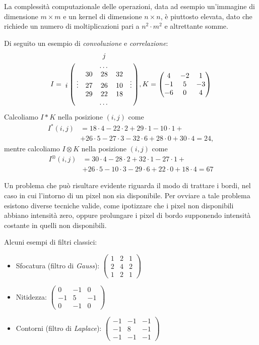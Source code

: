 La complessit\`a computazionale delle operazioni, data ad esempio un'immagine di dimensione $m\times m$ e un kernel di dimensione $n\times n$, \`e piuttosto elevata, dato che richiede un numero di moltiplicazioni pari a $n^{2}\cdot m^{2}$ e altrettante somme.\par
Di seguito un esempio di \textit{convoluzione} e \textit{correlazione}:
$$
I=\bordermatrix{
		& & & j & & \cr
        & & & \dots & & \cr
		& & 30 & 28 & 32 & \cr
		i & \vdots & 27 & 26 & 10 & \vdots \cr
		& & 29 & 22 & 18 & \cr
		& & & \dots & & \cr
	},
K=\begin{pmatrix} 
	4 & -2 & 1 \\
	-1 & 5 & -3\\
	-6 & 0 & 4
\end{pmatrix}
$$
Calcoliamo $I * K$ nella posizione $(i, j)$ come 
\begin{equation}
	\label{eq:convolution-example}
	\begin{split}
		I^{*}(i, j) & = 18\cdot 4 - 22\cdot 2 + 29\cdot 1 - 10\cdot 1+\\ 
		& + 26\cdot 5 -27\cdot 3 - 32\cdot 6 + 28\cdot 0 + 30\cdot 4 = 24,
	\end{split}
\end{equation}
mentre calcoliamo $I \otimes K$ nella posizione $(i, j)$ come 
\begin{equation}
	\label{eq:correlation-example}
	\begin{split}
		I^{\otimes}(i, j) & = 30\cdot 4 - 28\cdot 2 + 32\cdot 1 - 27\cdot 1+\\
		& + 26\cdot 5 -10\cdot 3 - 29\cdot 6 + 22\cdot 0 + 18\cdot 4 = 67
	\end{split}
\end{equation}\par
Un problema che pu\`o risultare evidente riguarda il modo di trattare i bordi, nel caso in cui l'intorno di un pixel non sia disponibile. Per ovviare a tale problema esistono diverse tecniche valide, come ipotizzare che i pixel non disponibili abbiano intensit\`a zero, oppure prolungare i pixel di bordo supponendo intensit\`a costante in quelli non disponibili.\par
Alcuni esempi di filtri classici:
\begin{itemize}
	\item Sfocatura (filtro di \textit{Gauss}): $\begin{pmatrix} 
		1 & 2 & 1 \\
		2 & 4 & 2\\
		1 & 2 & 1
	\end{pmatrix}$
	\item Nitidezza: $\begin{pmatrix} 
		0 & -1 & 0 \\
		-1 & 5 & -1\\
		0 & -1 & 0
	\end{pmatrix}$
	\item Contorni (filtro di \textit{Laplace}): $\begin{pmatrix} 
		-1 & -1 & -1 \\
		-1 & 8 & -1\\
		-1 & -1 & -1
	\end{pmatrix}$
\end{itemize}


